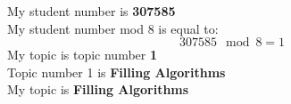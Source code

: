\documentclass{report}
\begin{document}
My student number is \textbf{307585} \\ 
My student number mod 8 is equal to: 
\[ 307585 \mod 8 = 1 \]
My topic is topic number \textbf{1} \\ 
Topic number 1 is \textbf{Filling Algorithms} \\
My topic is \textbf{Filling Algorithms} 
\end{document}
